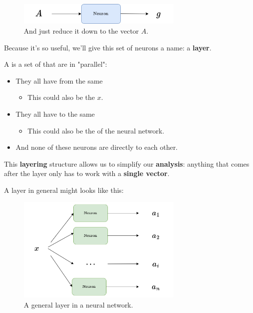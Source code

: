         \begin{figure}[H]
            \centering
            \includegraphics[width=80mm,scale=0.4]{images/nn_images/second_layer.png}
            \caption*{And just reduce it down to the vector $A$.}
        \end{figure}

        Because it's so useful, we'll give this set of neurons a name: a \textbf{layer}.\\
        
        \begin{definition}
            A  is a set of  that are in "parallel":
            \begin{itemize}
                \item They all have  from the same 
                    \begin{itemize}
                        \item This  could also be the  $x$.
                    \end{itemize}
                
                \item They all have  to the same 
                    \begin{itemize}
                        \item This  could also be the  of the neural network.
                    \end{itemize}
                
                \item And none of these neurons are directly  to each other.
            \end{itemize}
        \end{definition}
        
        This \textbf{layering} structure allows us to simplify our \textbf{analysis}: anything that comes after the layer only has to work with a \textbf{single vector}.
        
        A layer in general might looks like this:
        
        \begin{figure}[H]
            \centering
            \includegraphics[width=80mm,scale=0.4]{images/nn_images/general_layer.png}
            \caption*{A general layer in a neural network.}
        \end{figure}
        
